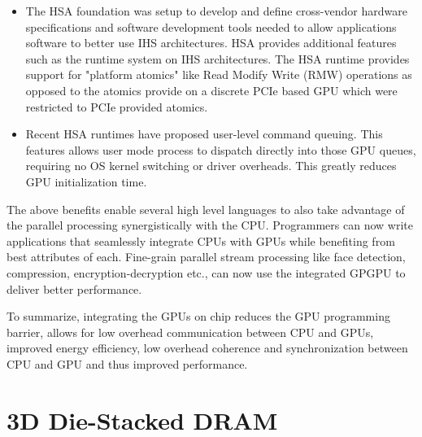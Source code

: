 \begin{itemize}
	\item The HSA foundation \cite{hsafoundation} was setup to develop and define cross-vendor hardware specifications and software development tools needed to allow applications software to better use IHS architectures. HSA provides additional features such as the runtime system on IHS architectures. The HSA runtime provides support for "platform atomics" like Read Modify Write (RMW) operations as opposed to the atomics provide on a discrete PCIe based GPU which were restricted to PCIe provided atomics. 
	\item Recent HSA runtimes \cite{hsa-queuing} have proposed user-level command queuing. This features allows user mode process to dispatch directly into those GPU queues, requiring no OS kernel switching or driver overheads. This greatly reduces GPU initialization time.
\end{itemize} 

The above benefits enable several high level languages \cite{sumatra,julia} to also take advantage of the parallel processing synergistically with the CPU. Programmers can now write applications that seamlessly integrate CPUs with GPUs while benefiting from best attributes of each. Fine-grain parallel stream processing like face detection, compression, encryption-decryption etc., can now use the integrated GPGPU to deliver better performance.  
\par To summarize, integrating the GPUs on chip reduces the GPU programming barrier, allows for low overhead communication between CPU and GPUs, improved energy efficiency, low overhead coherence and synchronization between CPU and GPU and thus improved performance.




\section{3D Die-Stacked DRAM} \label{stacked-dram-intro}

